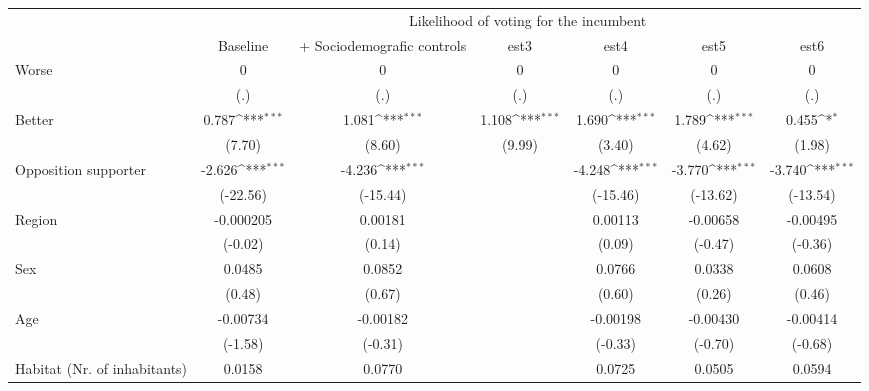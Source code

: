 {
\def\sym#1{\ifmmode^{#1}\else\(^{#1}\)\fi}
\begin{tabular}{l*{6}{c}}
\toprule
                &\multicolumn{6}{c}{Likelihood of voting for the incumbent}                                                       \\\cmidrule(lr){2-7}
                & Baseline         &+ Sociodemografic controls         &     est3         &     est4         &     est5         &     est6         \\
\midrule
Worse           &        0         &        0         &        0         &        0         &        0         &        0         \\
                &      (.)         &      (.)         &      (.)         &      (.)         &      (.)         &      (.)         \\
Better          &    0.787\sym{***}&    1.081\sym{***}&    1.108\sym{***}&    1.690\sym{***}&    1.789\sym{***}&    0.455\sym{*}  \\
                &   (7.70)         &   (8.60)         &   (9.99)         &   (3.40)         &   (4.62)         &   (1.98)         \\
Opposition supporter&   -2.626\sym{***}&   -4.236\sym{***}&                  &   -4.248\sym{***}&   -3.770\sym{***}&   -3.740\sym{***}\\
                & (-22.56)         & (-15.44)         &                  & (-15.46)         & (-13.62)         & (-13.54)         \\
Region          &-0.000205         &  0.00181         &                  &  0.00113         & -0.00658         & -0.00495         \\
                &  (-0.02)         &   (0.14)         &                  &   (0.09)         &  (-0.47)         &  (-0.36)         \\
Sex             &   0.0485         &   0.0852         &                  &   0.0766         &   0.0338         &   0.0608         \\
                &   (0.48)         &   (0.67)         &                  &   (0.60)         &   (0.26)         &   (0.46)         \\
Age             & -0.00734         & -0.00182         &                  & -0.00198         & -0.00430         & -0.00414         \\
                &  (-1.58)         &  (-0.31)         &                  &  (-0.33)         &  (-0.70)         &  (-0.68)         \\
Habitat (Nr. of inhabitants)&   0.0158         &   0.0770         &                  &   0.0725         &   0.0505         &   0.0594         \\

\end{tabular}}

